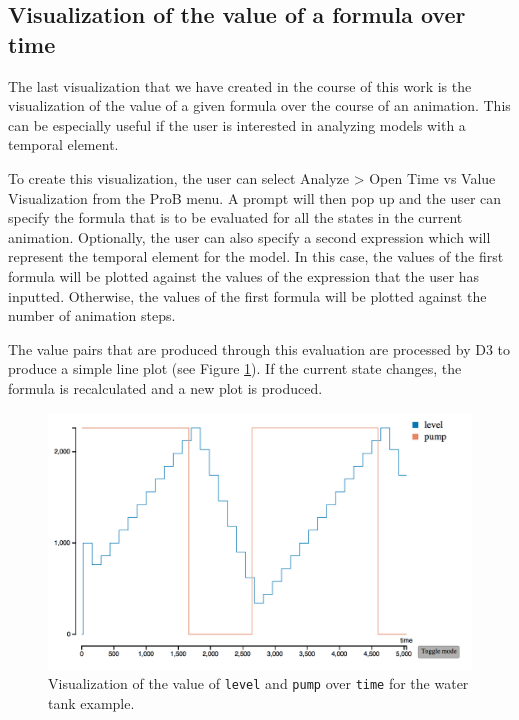 \subsection{Visualization of the value of a formula over time}

The last visualization that we have created in the course of this work is the visualization of the value of a given formula over the course of an animation.
This can be especially useful if the user is interested in analyzing models with a temporal element. 

To create this visualization, the user can select \textsf{Analyze > Open Time vs Value Visualization} from the \textsf{ProB} menu. A prompt will then pop up and the user can specify the formula that is to be evaluated for all the states in the current animation. Optionally, the user can also specify a second expression which will represent the temporal element for the model. In this case, the values of the first formula will be plotted against the values of the expression that the user has inputted. Otherwise, the values of the first formula will be plotted against the number of animation steps.

The value pairs that are produced through this evaluation are processed by D3 to produce a simple line plot (see Figure \ref{timeVsValue}). If the current state changes, the formula is recalculated and a new plot is produced.

\begin{center}
\begin{figure}[h!]
\centering
\includegraphics[width=15cm]{bilder/vOtOver.png}
\caption{Visualization of the value of \texttt{level} and \texttt{pump} over \texttt{time} for the water tank example.}
\label{timeVsValue}
\end{figure}
\end{center}

